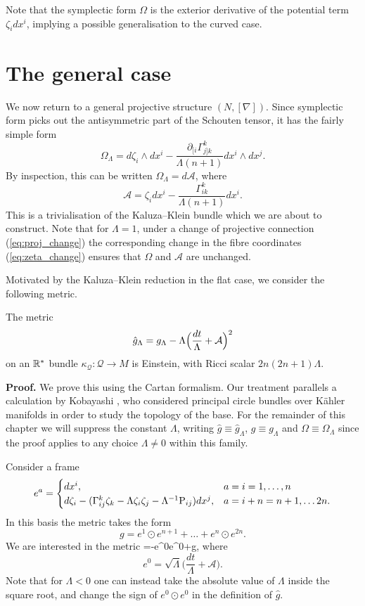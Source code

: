Note that the symplectic form $\Omega$ is the exterior derivative
of the potential term $\zeta_{i} dx^{i}$, implying a possible
generalisation to the curved case.


\section{The general case}

We now return to a general projective structure $(N,[\nabla])$. Since
symplectic form picks out the antisymmetric part of the Schouten tensor,
it has the fairly simple form
\[
\Omega_{\Lambda}= d\zeta_{i}\wedge dx^{i}-\frac{\partial_{[i}\Gamma_{j]k}^{k}}{\Lambda(n+1)} dx^{i}\wedge dx^{j}.
\]
By inspection, this can be written $\Omega_{\Lambda}=d\mathcal{A}$,
where
\[
\mathcal{A}=\zeta_{i} dx^{i}-\frac{\Gamma_{ik}^{k}}{\Lambda(n+1)} dx^{i}.
\]
This is a trivialisation of the Kaluza--Klein bundle which we are about
to construct. Note that for $\Lambda=1$, under a change of projective
connection (\ref{eq:proj_change}) the corresponding change in the
fibre coordinates (\ref{eq:zeta_change}) ensures that $\Omega$ and
$\mathcal{A}$ are unchanged.

Motivated by the Kaluza--Klein reduction in the flat case, we consider
the following metric.
\begin{theo}
The metric
\begin{equation}
\hat{g}_{\Lambda}=g_{\Lambda}-\Lambda\Bigl(\frac{ dt}{\Lambda}+\mathcal{A}\Bigr)^{2}\label{eq:G}
\end{equation}
on an $\mathbb{R}^*$ bundle $\kappa_\mathcal{Q}:\mathcal{Q}\rightarrow M$ is Einstein,
with Ricci scalar $2n(2n+1)\Lambda$.
\end{theo}
\textbf{Proof.} We prove this using the Cartan formalism. Our treatment
parallels a calculation by Kobayashi \cite{Kob}, who considered
principal circle bundles over K\"ahler manifolds in order to study the
topology of the base. For the remainder of this chapter we will suppress the constant $\Lambda$, writing $\hat{g}\equiv\hat{g}_{\Lambda}$, $g\equiv g_{\Lambda}$ and $\Omega\equiv\Omega_\Lambda$ since the proof applies to any choice $\Lambda\neq0$ within this family.

Consider a frame
\begin{equation}
e^{a}=\begin{cases}
 dx^{i}, & a=i=1,\dots,n\\
 d\zeta_{i}-(\Gamma_{ij}^{k}\zeta_{k}-\Lambda \zeta_{i}\zeta_{j}-\Lambda^{-1}\mathrm{P}_{ij}) dx^{j}, & a=i+n=n+1,\dots2n.
\end{cases}\label{eq:basis}
\end{equation}
In this basis the metric takes the form
\begin{equation}
g=e^{1}\odot e^{n+1}+\dots+e^{n}\odot e^{2n}.\label{eq:g_cov_const}
\end{equation}
We are interested in the metric
\be \label{eq:lifted_metric}
=-e^{0}\odot e^{0}+g,
\ee
where
\[
e^{0}=\sqrt{\Lambda}\biggl(\frac{ dt}{\Lambda}+\mathcal{A}\biggr).
\]
Note that for $\Lambda<0$ one can instead take the absolute value of $\Lambda$ inside the square root, and change the sign of $e^{0}\odot e^{0}$ in the definition of $\hat{g}$.

